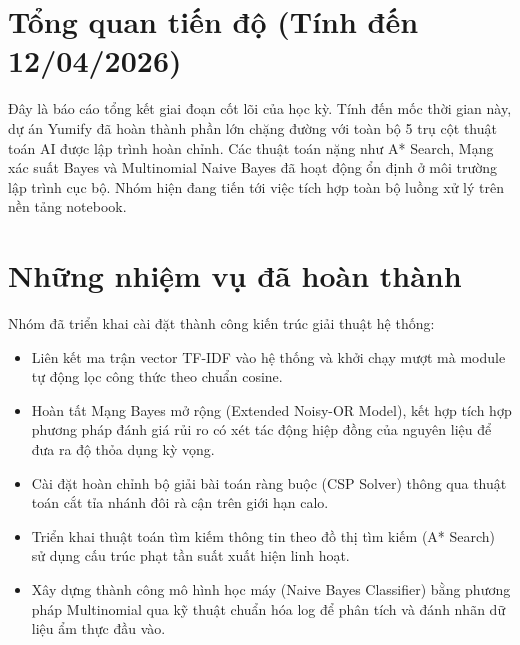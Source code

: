 \documentclass[a4paper, 12pt]{article}
\begin{document}
\newpage


\section{Tổng quan tiến độ (Tính đến 12/04/2026)}
Đây là báo cáo tổng kết giai đoạn cốt lõi của học kỳ. Tính đến mốc thời gian này, dự án Yumify đã hoàn thành phần lớn chặng đường với toàn bộ 5 trụ cột thuật toán AI được lập trình hoàn chỉnh. Các thuật toán nặng như A* Search, Mạng xác suất Bayes và Multinomial Naive Bayes đã hoạt động ổn định ở môi trường lập trình cục bộ. Nhóm hiện đang tiến tới việc tích hợp toàn bộ luồng xử lý trên nền tảng notebook.

\section{Những nhiệm vụ đã hoàn thành}
Nhóm đã triển khai cài đặt thành công kiến trúc giải thuật hệ thống:
\begin{itemize}
    \item Liên kết ma trận vector TF-IDF vào hệ thống và khởi chạy mượt mà module tự động lọc công thức theo chuẩn cosine.
    \item Hoàn tất Mạng Bayes mở rộng (Extended Noisy-OR Model), kết hợp tích hợp phương pháp đánh giá rủi ro có xét tác động hiệp đồng của nguyên liệu để đưa ra độ thỏa dụng kỳ vọng.
    \item Cài đặt hoàn chỉnh bộ giải bài toán ràng buộc (CSP Solver) thông qua thuật toán cắt tỉa nhánh đôi rà cận trên giới hạn calo.
    \item Triển khai thuật toán tìm kiếm thông tin theo đồ thị tìm kiếm (A* Search) sử dụng cấu trúc phạt tần suất xuất hiện linh hoạt.
    \item Xây dựng thành công mô hình học máy (Naive Bayes Classifier) bằng phương pháp Multinomial qua kỹ thuật chuẩn hóa log để phân tích và đánh nhãn dữ liệu ẩm thực đầu vào.
\end{itemize}
\end{document}
